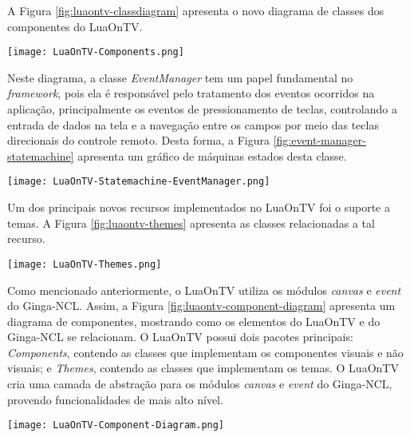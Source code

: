 A Figura \ref{fig:luaontv-classdiagram} apresenta o novo diagrama de classes dos componentes do LuaOnTV.

\begin{center}
	\texttt{[image: LuaOnTV-Components.png]}
	\label{fig:luaontv-classdiagram}
\end{center}

Neste diagrama, a classe \textit{EventManager} tem um papel fundamental no \textit{framework}, pois ela é responsável pelo tratamento
dos eventos ocorridos na aplicação, principalmente os eventos de pressionamento de teclas,
controlando a entrada de dados na tela e a navegação entre os campos por meio das teclas direcionais
do controle remoto. Desta forma, a Figura \ref{fig:event-manager-statemachine}
apresenta um gráfico de máquinas estados desta classe.

\begin{center}
	\texttt{[image: LuaOnTV-Statemachine-EventManager.png]}
	\label{fig:event-manager-statemachine}
\end{center}

Um dos principais novos recursos implementados no LuaOnTV 
foi o suporte a temas. A Figura \ref{fig:luaontv-themes} apresenta as classes relacionadas a tal recurso.

\begin{center}
	\texttt{[image: LuaOnTV-Themes.png]}
	\label{fig:luaontv-themes}
\end{center}

Como mencionado anteriormente, o LuaOnTV utiliza os módulos \textit{canvas} e \textit{event} do Ginga-NCL.
Assim, a Figura \ref{fig:luaontv-component-diagram} apresenta um diagrama de componentes,
mostrando como os elementos do LuaOnTV e do Ginga-NCL se relacionam.
O LuaOnTV possui dois pacotes principais: \textit{Components}, contendo as classes
que implementam os componentes visuais e não visuais; e \textit{Themes}, contendo
as classes que implementam os temas. O LuaOnTV cria uma camada
de abstração para os módulos \textit{canvas} e \textit{event} do Ginga-NCL, provendo
funcionalidades de mais alto nível.

\begin{center}
	\texttt{[image: LuaOnTV-Component-Diagram.png]}
  \label{fig:luaontv-component-diagram}
\end{center}

